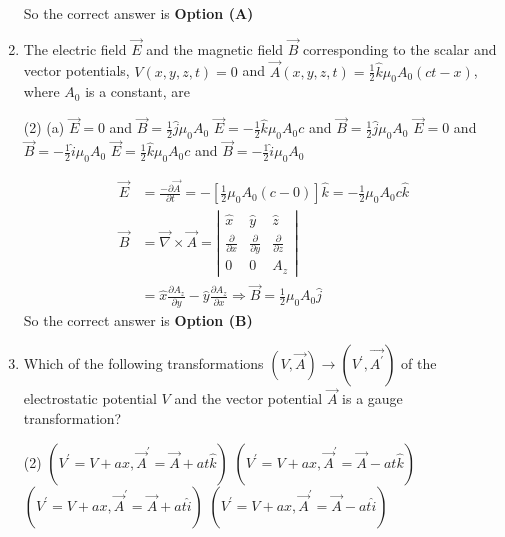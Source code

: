 \begin{enumerate}
\begin{answer}
	So the correct answer is \textbf{Option (A)}
\end{answer}
	\item   The electric field $\vec{E}$ and the magnetic field $\vec{B}$ corresponding to the scalar and vector potentials, $V(x, y, z, t)=0$ and $\vec{A}(x, y, z, t)=\frac{1}{2} \hat{k} \mu_{0} A_{0}(c t-x)$, where $A_{0}$ is a constant, are 
	{}
	\begin{tasks}(2)
		\task[\textbf{A.}] (a) $\vec{E}=0$ and $\vec{B}=\frac{1}{2} \hat{j} \mu_{0} A_{0}$
		\task[\textbf{B.}] $\vec{E}=-\frac{1}{2} \hat{k} \mu_{0} A_{0} c$ and $\vec{B}=\frac{1}{2} \hat{j} \mu_{0} A_{0}$
		\task[\textbf{C.}]  $\vec{E}=0$ and $\vec{B}=-\frac{1}{2} \hat{i} \mu_{0} A_{0}$
		\task[\textbf{D.}] $\vec{E}=\frac{1}{2} \hat{k} \mu_{0} A_{0} c$ and $\vec{B}=-\frac{1}{2} \hat{i} \mu_{0} A_{0}$
	\end{tasks}
\begin{answer}
	\begin{align*}
	\vec{E}&=\frac{-\partial \vec{A}}{\partial t}=-\left[\frac{1}{2} \mu_{0} A_{0}(c-0)\right] \hat{k}=-\frac{1}{2} \mu_{0} A_{0} c \hat{k}\\
	\vec{B}&=\vec{\nabla} \times \vec{A}=\left|\begin{array}{ccc}\hat{x} & \hat{y} & \hat{z} \\ \frac{\partial}{\partial x} & \frac{\partial}{\partial y} & \frac{\partial}{\partial z} \\ 0 & 0 & A_{z}\end{array}\right|\\&=\hat{x} \frac{\partial A_{z}}{\partial y}-\hat{y} \frac{\partial A_{z}}{\partial x} \Rightarrow \vec{B}=\frac{1}{2} \mu_{0} A_{0} \hat{j}
	\end{align*}
	So the correct answer is \textbf{Option (B)}
\end{answer}
	\item  Which of the following transformations $(V, \vec{A}) \rightarrow\left(V^{\prime}, \overrightarrow{A^{\prime}}\right)$ of the electrostatic potential $V$ and the vector potential $\vec{A}$ is a gauge transformation?
	{}
	\begin{tasks}(2)
		\task[\textbf{a.}]$\left(V^{\prime}=V+a x, \vec{A}^{\prime}=\vec{A}+a t \hat{k}\right)$
		\task[\textbf{b.}]$\left(V^{\prime}=V+a x, \vec{A}^{\prime}=\vec{A}-a t \hat{k}\right)$
		\task[\textbf{c.}]$\left(V^{\prime}=V+a x, \vec{A}^{\prime}=\vec{A}+a t \hat{i}\right)$
		\task[\textbf{d.}] $\left(V^{\prime}=V+a x, \vec{A}^{\prime}=\vec{A}-a t \hat{i}\right)$

\end{tasks}
\end{enumerate}
